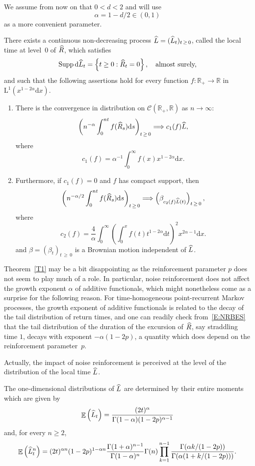 \documentclass[AHL,Unicode,longabstracts,published]{cedram}
\renewcommand{\hat}[1]{\widehat{#1}}
\newcommand{\dd}{\mathrm{d}}
\newcommand{\rmL}{\mathrm{L}}
\newcommand{\Supp}{\mathrm{Supp}}
\DeclareMathOperator{\E}{\mathbb{E}}
\newcommand{\R}{\mathbb{R}}
\newcommand{\calC}{\mathcal{C}}
\newcommand*{\romanenumi}{\renewcommand*{\theenumi}{\roman{enumi}}}
\let\oldhat\hat
\renewcommand*{\hat}[1]{\mathchoice{\widehat{#1}}{\widehat{#1}}{\oldhat{#1}}{\oldhat{#1}}}
\begin{document}
We assume from now on that $0<d<2$ and will use
\[
\alpha= 1-d/2 \in(0,1)
\]
as a more convenient parameter.

\begin{theo}\label{T1}
There exists a continuous non-decreasing process $\hat{L} = (\hat{L}_t)_{t\,\geq\,0}$, called the local time at level~$0$ of $\hat R$, which satisfies
\[
\Supp\, \dd \hat{L}_t =\left\{t\geq0: \hat R_t=0\right\}, \quad \text{almost surely,}
\]
and such that the following assertions hold for every function $f: \R_+\to \R$ in $ \rmL^1(x^{1-2\alpha} \dd x)$.
\begin{enumerate}\romanenumi
\item \label{theo1.1.i}
There is the convergence in distribution on $\calC(\R_+,\R)$ as $n\to \infty$:
\[
\left(n^{-\alpha} \int_0^{nt} f(\hat R_s) \dd s\right)_{t\,\geq\,0} \Longrightarrow c_1(f)\hat{L},
\]
where
\[
c_1(f)= \alpha^{-1} \int_0^{\infty} f(x) x^{1-2\alpha} \dd x.
\]

\item\label{theo1.1.ii} Furthermore, if $c_1(f)=0$ and $f$ has compact support, then
\[
\left(n^{-\alpha/2} \int_0^{nt} f(\hat R_s) \dd s\right)_{t\,\geq\,0} \Longrightarrow \left(\beta_{c_2(f)\hat{L}(t)}\right)_{t\,\geq\,0},
\]
where
\[
c_2(f)= \frac{4}{\alpha} \int_0^{\infty} \left(\int_{0}^{x} f(t) t^{1-2\alpha} \dd t \right)^2 x^{2\alpha-1}\dd x.
\]
and $\beta = (\beta_t)_{t\,\geq\,0}$ is a Brownian motion independent of $\hat{L}$.
\end{enumerate}
\end{theo}

Theorem~\ref{T1} may be a bit disappointing as the reinforcement parameter $p$ does not seem to play much of a role. In particular, noise reinforcement does not affect the growth exponent $\alpha$ of additive functionals, which might nonetheless come as a surprise for the following reason. For time-homogeneous point-recurrent Markov processes, the growth exponent of additive functionals is related to the decay of the tail distribution of return times, and one can readily check from~\eqref{E:NRBES} that the tail distribution of the duration of the excursion of $\hat R$, say straddling time $1$, decays with exponent $-\alpha(1-2p)$, a quantity which does depend on the reinforcement parameter~$p$.


Actually, the impact of noise reinforcement is perceived at the level of the distribution of the local time $\hat{L}$.

\begin{theo}\label{T2}
The one-dimensional distributions of $\hat{L}$ are determined by their entire moments which are given by
\[
\E\left(\hat{L}_t\right)=\frac{(2t)^{\alpha }}{\Gamma(1-\alpha) (1-2p)^{\alpha -1}}
\]
and, for every $n\geq 2$,
\[
\E\left(\hat{L}_t^n\right)= (2t)^{\alpha n} (1-2p)^{1-\alpha n}
\frac{\Gamma(1+\alpha)^{n-1}}{ \Gamma(1-\alpha)^n} \Gamma(n)
\prod_{k=1}^{n-1} \frac{\Gamma(\alpha k/(1-2p))}{\Gamma(\alpha(1+k/(1-2p)))}.
\]
\end{theo}
\end{document}
